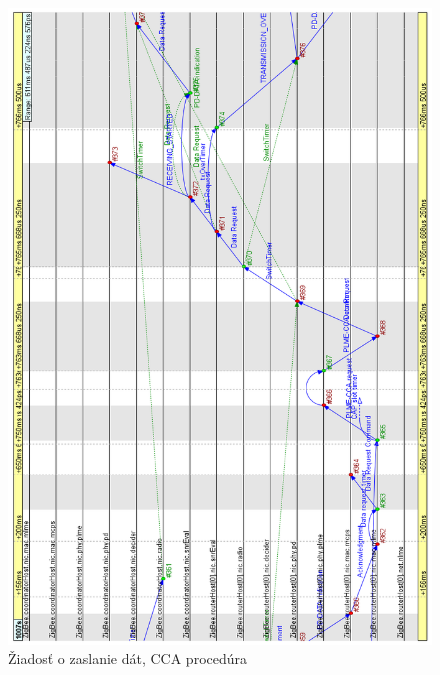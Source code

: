 \begin{figure}[htbp]
\begin{center}
\includegraphics[width=140mm]{figures/chart_data_request}
\caption{Žiadosť o zaslanie dát, CCA procedúra}
\label{fig:chart_data_request}
\end{center}
\end{figure}

